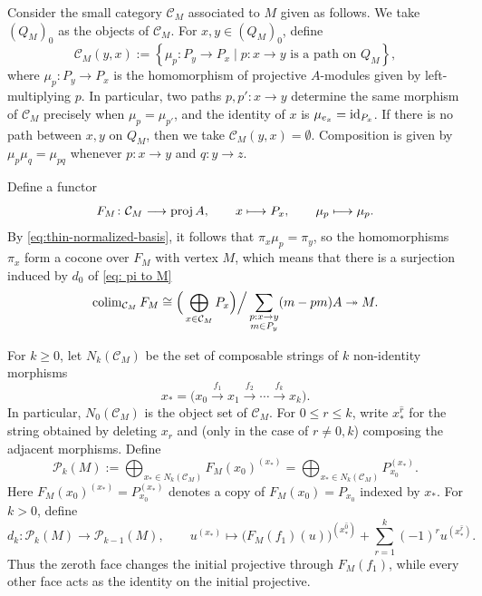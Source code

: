 \documentclass[a4paper,leqno]{amsart}
\begin{document}
Consider the small category $\mathcal C_M$ associated to $M$ given as follows.  We take $(Q_M)_0$ as the objects of $\mathcal{C}_M$. For $x,y\in(Q_M)_0$, define
\[
\mathcal C_M(y,x)
:= \left\{ \mu_p:P_y\to P_x \mid p:x\to y\text{ is a path on }Q_M \right\},
\]
where $\mu_p:P_y\to P_x$ is the homomorphism of projective $A$-modules given by left-multiplying $p$. In particular, two paths $p,p':x\to y$ determine the same morphism of $\mathcal C_M$ precisely when $\mu_p=\mu_{p'}$, and the identity of $x$ is $\mu_{e_x} = \operatorname{id}_{P_x}$. If there is no path between $x,y$ on $Q_M$, then we take $\mathcal{C}_M(y,x)=\emptyset$. Composition is given by $\mu_p\mu_q=\mu_{pq}$ whenever $p:x\to y$ and $q:y\to z$.

Define a functor
\begin{equation*}
F_M\colon\mathcal C_M\longrightarrow\operatorname{proj} A,
\qquad
x\longmapsto P_x,
\qquad
\mu_p\longmapsto\mu_p.
\end{equation*}
By \eqref{eq:thin-normalized-basis}, it follows that $\pi_x\mu_p=\pi_y$, so the homomorphisms $\pi_x$ form a cocone over $F_M$ with vertex $M$, which means that there is a surjection induced by $d_0$ of \eqref{eq: pi to M}
\[
\operatorname{colim}_{\mathcal{C}_M} F_M
\cong \Big(\bigoplus_{x\in \mathcal{C}_M} P_x\Big)
\Big/ \sum_{\substack{p:x\to y\\ m\in P_y}} (m-pm)A
\twoheadrightarrow M.
\]


For $k\geq0$, let $N_k(\mathcal C_M)$ be the set of composable strings of $k$ non-identity morphisms
\begin{equation}\label{eq:x ast string}
x_\ast=
\bigl(
x_0\xrightarrow{f_1}x_1\xrightarrow{f_2}\cdots
\xrightarrow{f_k}x_k
\bigr).
\end{equation}
In particular, $N_0(\mathcal C_M)$ is the object set of $\mathcal C_M$.  For $0\leq r\leq k$, write $x_\ast^{\widehat r}$ for the string obtained by deleting $x_r$ and (only in the case of $r\neq 0,k$) composing the adjacent morphisms.  Define
\begin{equation*}
\mathcal P_k(M):=
\bigoplus_{x_\ast\in N_k(\mathcal C_M)}
F_M(x_0)^{(x_\ast)} = \bigoplus_{x_\ast\in N_k(\mathcal C_M)}
P_{x_0}^{(x_\ast)}.
\end{equation*}
Here \(F_M(x_0)^{(x_\ast)} = P_{x_0}^{(x_\ast)}\) denotes a copy of \(F_M(x_0)=P_{x_0}\) indexed by $x_\ast$.  For $k>0$, define
\[
d_k\colon\mathcal P_k(M)\longrightarrow\mathcal P_{k-1}(M),
\qquad u^{(x_\ast)}
\mapsto
\bigl(F_M(f_1)(u)\bigr)^{(x_\ast^{\widehat0})}
+\sum_{r=1}^k(-1)^r
u^{(x_\ast^{\widehat r})}.
\]
Thus the zeroth face changes the initial projective through $F_M(f_1)$, while every other face acts as the identity on the initial projective.
\end{document}
